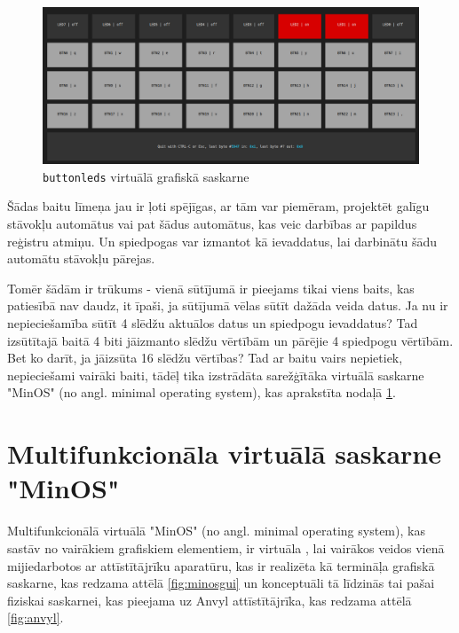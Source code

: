 \begin{figure}[H]
    \includegraphics[width=0.9\linewidth]{assets/buttonleds.png}
    \centering
    \caption{\lstinline!buttonleds! virtuālā grafiskā saskarne}
    \label{fig:buttonleds}
\end{figure}

Šādas baitu līmeņa  jau ir ļoti spējīgas, ar tām var piemēram,
projektēt galīgu stāvokļu automātus vai pat šādus automātus, kas veic darbības
ar papildus reģistru atmiņu. Un spiedpogas var izmantot kā ievaddatus, lai
darbinātu šādu automātu stāvokļu pārejas.

Tomēr šādām  ir trūkums - vienā sūtījumā ir
pieejams tikai viens baits, kas patiesībā nav daudz, it īpaši, ja sūtījumā vēlas
sūtīt dažāda veida datus. Ja nu ir nepieciešamība sūtīt 4 slēdžu aktuālos datus
un spiedpogu ievaddatus? Tad izsūtītajā baitā 4 biti jāizmanto slēdžu vērtībām
un pārējie 4 spiedpogu vērtībām. Bet ko darīt, ja jāizsūta 16 slēdžu vērtības?
Tad ar baitu vairs nepietiek, nepieciešami vairāki baiti, tādēļ tika izstrādāta
sarežģītāka virtuālā saskarne "MinOS" (no angl. minimal operating system), kas
aprakstīta nodaļā \ref{sec:vinminos}.

\section{Multifunkcionāla virtuālā saskarne "MinOS"}
\label{sec:vinminos}

Multifunkcionālā virtuālā  "MinOS" (no angl.
minimal operating system), kas sastāv no vairākiem grafiskiem elementiem, ir
virtuāla , lai vairākos veidos vienā
 mijiedarbotos ar attīstītājrīku aparatūru, kas ir
realizēta kā termināļa grafiskā saskarne, kas redzama attēlā \ref{fig:minosgui}
un konceptuāli tā līdzinās tai pašai fiziskai saskarnei, kas pieejama uz Anvyl
attīstītājrīka, kas redzama attēlā \ref{fig:anvyl}. 


